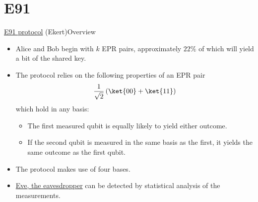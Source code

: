 \section*{E91}

\begin{frame}{\href{https://en.wikipedia.org/wiki/Quantum_key_distribution\#E91_protocol:_Artur_Ekert_(1991)}{E91 protocol} (Ekert)}{Overview}

\Vskip{-3em}\begin{itemize}[<+->]
    \item Alice and Bob begin with $k$ EPR pairs, approximately $22\%$ of which will yield a bit of the shared key.
    \item The protocol relies on the following properties of an EPR pair \[\RootTwo{}\left(\ket{00}+\ket{11}\right)\] which hold in any basis:
    \begin{itemize}
        \item The first measured qubit is equally likely to yield either outcome.
        \item If the second qubit is measured in the same basis as the first, it yields the same outcome as the first qubit.
    \end{itemize}
    \item The protocol makes use of four bases.
    \item \href{https://en.wikipedia.org/wiki/Alice_and_Bob\#Cast_of_characters}{Eve, the eavesdropper} can be detected by statistical analysis of the measurements.
\end{itemize}

\end{frame}

